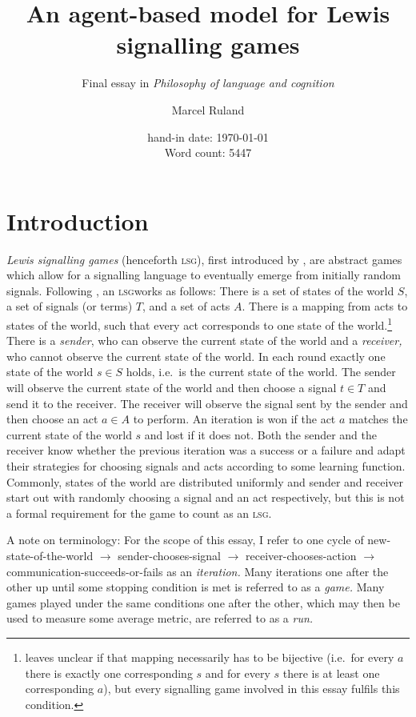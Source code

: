 \documentclass[
	DIV=calc,
	BCOR=0mm,
	pagesize,
	titlepage
]{scrartcl}
\title{An agent-based model for Lewis signalling games}
\subtitle{Final essay in \emph{Philosophy of language and cognition}}
\author{Marcel Ruland}
\date{hand-in date: \today \\ Word count: 5447}
\newcommand{\lsg}{\textsc{lsg}}
\begin{document}
\maketitle
\tableofcontents
\newpage

\section{Introduction}
\label{sec:int}
\emph{Lewis signalling games} (henceforth \lsg), first introduced by \citet{lewis_convention_1969}, are abstract games which allow for a signalling language to eventually emerge from initially random signals.
Following \citet[p.~530~ff.]{barrett_dynamic_2007}, an \lsg works as follows:
There is a set of states of the world \(S\), a set of signals (or terms) \(T\), and a set of acts \(A\).
There is a mapping from acts to states of the world, such that every act corresponds to one state of the world.\footnote{\citet{barrett_dynamic_2007} leaves unclear if that mapping necessarily has to be bijective (i.e.~for every \(a\) there is exactly one corresponding \(s\) and for every \(s\) there is at least one corresponding \(a\)), but every signalling game involved in this essay fulfils this condition.}
There is a \emph{sender}, who can observe the current state of the world and a \emph{receiver,} who cannot observe the current state of the world.
In each round exactly one state of the world \(s \in S\) holds, i.e.~is the current state of the world.
The sender will observe the current state of the world and then choose a signal \(t \in T\) and send it to the receiver.
The receiver will observe the signal sent by the sender and then choose an act \(a \in A\) to perform.
An iteration is won if the act \(a\) matches the current state of the world \(s\) and lost if it does not.
Both the sender and the receiver know whether the previous iteration was a success or a failure and adapt their strategies for choosing signals and acts according to some learning function.
Commonly, states of the world are distributed uniformly and sender and receiver start out with randomly choosing a signal and an act respectively, but this is not a formal requirement for the game to count as an \lsg.

A note on terminology: For the scope of this essay, I refer to one cycle of new-state-of-the-world \(\rightarrow\) sender-chooses-signal \(\rightarrow\) receiver-chooses-action \(\rightarrow\) communication-succeeds-or-fails as an \emph{iteration.}
Many iterations one after the other up until some stopping condition is met is referred to as a \emph{game.}
Many games played under the same conditions one after the other, which may then be used to measure some average metric, are referred to as a \emph{run.}
\end{document}
